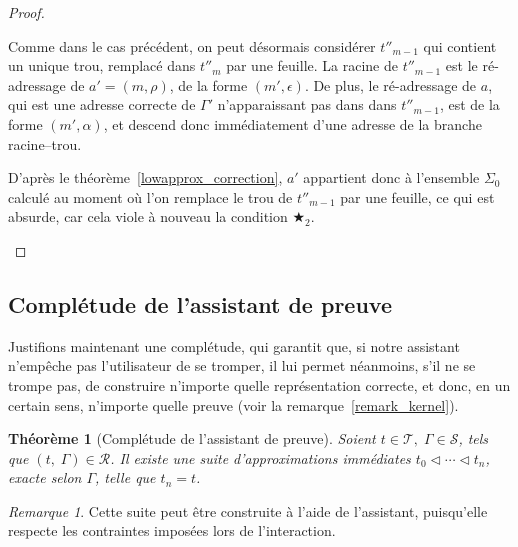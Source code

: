 \documentclass[11pt,a4paper]{article}
\theoremstyle{plain}
\newtheorem{theorem}{Théorème}
\theoremstyle{definition}
\theoremstyle{remark}
\newtheorem{remark}{Remarque}
\newcommand*{\sequent}{\Gamma}
\newcommand*{\sequents}{\ensuremath{\mathcal{S}}}
\newcommand*{\trees}{\ensuremath{\mathcal{T}}}
\newcommand*{\representations}{\ensuremath{\mathcal{R}}}
\newcommand*{\relapprox}{\ensuremath{\triangleleft}}
\newcommand*{\lowapprox}{\ensuremath{\Sigma_0}}
\newcommand*{\exactcondbis}{\bigstar_2}
\begin{document}
\begin{proof}
\begin{description}
        Comme dans le cas précédent, on peut désormais considérer $t''_{m-1}$ qui contient un unique trou, remplacé dans $t''_m$ par une feuille. La racine de $t''_{m-1}$ est le ré-adressage de $a' = (m, \rho)$, de la forme $(m', \epsilon)$. De plus, le ré-adressage de $a$, qui est une adresse correcte de $\sequent'$ n'apparaissant pas dans dans $t''_{m-1}$, est de la forme $(m', \alpha)$, et descend donc immédiatement d'une adresse de la branche racine--trou.

        D'après le théorème~\ref{lowapprox_correction}, $a'$ appartient donc à l'ensemble $\lowapprox$ calculé au moment où l'on remplace le trou de $t''_{m-1}$ par une feuille, ce qui est absurde, car cela viole à nouveau la condition $\exactcondbis$.
\qedhere
    \end{description}
\end{proof}

\subsection{Complétude de l'assistant de preuve}

Justifions maintenant une complétude, qui garantit que, si notre assistant n'empêche pas l'utilisateur de se tromper, il lui permet néanmoins, s'il ne se trompe pas, de construire n'importe quelle représentation correcte, et donc, en un certain sens, n'importe quelle preuve (voir la remarque~\ref{remark_kernel}).

\begin{theorem}[Complétude de l'assistant de preuve]
    \label{completeness}
    Soient $t \in \trees, \; \sequent \in \sequents$, tels que $(t, \; \sequent) \in \representations$.
    Il existe une suite d'approximations immédiates $t_0 \relapprox \cdots \relapprox t_n$, exacte selon $\sequent$, telle que $t_n = t$.
\end{theorem}

\begin{remark}
    Cette suite peut être construite à l'aide de l'assistant, puisqu'elle respecte les contraintes imposées lors de l'interaction.
\end{remark}
\end{document}
